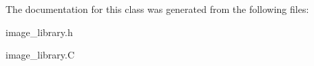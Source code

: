 The documentation for this class was generated from the following files\-:\begin{DoxyCompactItemize}
\item 
image\-\_\-library.\-h\item 
image\-\_\-library.\-C\end{DoxyCompactItemize}
